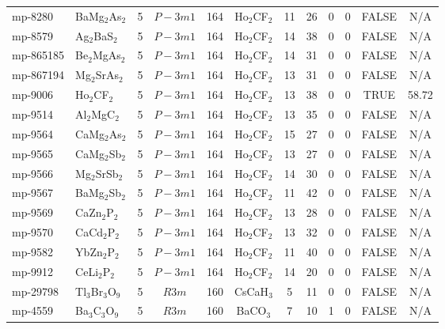 {\begin{longtable}{llcccccccccc}
    mp-8280 & BaMg$_{2}$As$_{2}$ & 5     & $P-3m1$ & 164   & Ho$_{2}$CF$_{2}$ & 11    & 26    & 0     & 0     & FALSE & N/A \\
    mp-8579 & Ag$_{2}$BaS$_{2}$ & 5     & $P-3m1$ & 164   & Ho$_{2}$CF$_{2}$ & 14    & 38    & 0     & 0     & FALSE & N/A \\
    mp-865185 & Be$_{2}$MgAs$_{2}$ & 5     & $P-3m1$ & 164   & Ho$_{2}$CF$_{2}$ & 14    & 31    & 0     & 0     & FALSE & N/A \\
    mp-867194 & Mg$_{2}$SrAs$_{2}$ & 5     & $P-3m1$ & 164   & Ho$_{2}$CF$_{2}$ & 13    & 31    & 0     & 0     & FALSE & N/A \\
    mp-9006 & Ho$_{2}$CF$_{2}$ & 5     & $P-3m1$ & 164   & Ho$_{2}$CF$_{2}$ & 13    & 38    & 0     & 0     & TRUE  & 58.72  \\
    mp-9514 & Al$_{2}$MgC$_{2}$ & 5     & $P-3m1$ & 164   & Ho$_{2}$CF$_{2}$ & 13    & 35    & 0     & 0     & FALSE & N/A \\
    mp-9564 & CaMg$_{2}$As$_{2}$ & 5     & $P-3m1$ & 164   & Ho$_{2}$CF$_{2}$ & 15    & 27    & 0     & 0     & FALSE & N/A \\
    mp-9565 & CaMg$_{2}$Sb$_{2}$ & 5     & $P-3m1$ & 164   & Ho$_{2}$CF$_{2}$ & 13    & 27    & 0     & 0     & FALSE & N/A \\
    mp-9566 & Mg$_{2}$SrSb$_{2}$ & 5     & $P-3m1$ & 164   & Ho$_{2}$CF$_{2}$ & 14    & 30    & 0     & 0     & FALSE & N/A \\
    mp-9567 & BaMg$_{2}$Sb$_{2}$ & 5     & $P-3m1$ & 164   & Ho$_{2}$CF$_{2}$ & 11    & 42    & 0     & 0     & FALSE & N/A \\
    mp-9569 & CaZn$_{2}$P$_{2}$ & 5     & $P-3m1$ & 164   & Ho$_{2}$CF$_{2}$ & 13    & 28    & 0     & 0     & FALSE & N/A \\
    mp-9570 & CaCd$_{2}$P$_{2}$ & 5     & $P-3m1$ & 164   & Ho$_{2}$CF$_{2}$ & 13    & 32    & 0     & 0     & FALSE & N/A \\
    mp-9582 & YbZn$_{2}$P$_{2}$ & 5     & $P-3m1$ & 164   & Ho$_{2}$CF$_{2}$ & 11    & 40    & 0     & 0     & FALSE & N/A \\
    mp-9912 & CeLi$_{2}$P$_{2}$ & 5     & $P-3m1$ & 164   & Ho$_{2}$CF$_{2}$ & 14    & 20    & 0     & 0     & FALSE & N/A \\
    mp-29798 & Tl$_{3}$Br$_{3}$O$_{9}$ & 5     & $R3m$ & 160   & CsCaH$_{3}$ & 5     & 11    & 0     & 0     & FALSE & N/A \\
    mp-4559 & Ba$_{3}$C$_{3}$O$_{9}$ & 5     & $R3m$ & 160   & BaCO$_{3}$ & 7     & 10    & 1     & 0     & FALSE & N/A \\

\end{longtable}}
